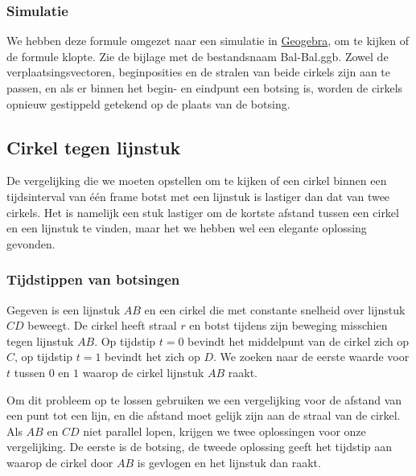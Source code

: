 \documentclass[12pt,a4paper]{article}
\begin{document}
	\subsubsection{Simulatie}
	We hebben deze formule omgezet naar een simulatie in \href{http://www.geogebra.org/webstart/geogebra.html}{Geogebra}, om te kijken of de formule klopte. Zie de bijlage met de bestandsnaam Bal-Bal.ggb. Zowel de verplaatsingsvectoren, beginposities en de stralen van beide cirkels zijn aan te passen, en als er binnen het begin- en eindpunt een botsing is, worden de cirkels opnieuw gestippeld getekend op de plaats van de botsing.
	
	\subsection{Cirkel tegen lijnstuk}
	De vergelijking die we moeten opstellen om te kijken of een cirkel binnen een tijdsinterval van \'{e}\'{e}n frame botst met een lijnstuk is lastiger dan dat van twee cirkels. Het is namelijk een stuk lastiger om de kortste afstand tussen een cirkel en een lijnstuk te vinden, maar het we hebben wel een elegante oplossing gevonden.
	
	\subsubsection{Tijdstippen van botsingen}
	Gegeven is een lijnstuk $AB$ en een cirkel die met constante snelheid over lijnstuk $CD$ beweegt. De cirkel heeft straal $r$ en botst tijdens zijn beweging misschien tegen lijnstuk $AB$. Op tijdstip $t=0$ bevindt het middelpunt van de cirkel zich op $C$, op tijdstip $t=1$ bevindt het zich op $D$. We zoeken naar de eerste waarde voor $t$ tussen $0$ en $1$ waarop de cirkel lijnstuk $AB$ raakt.
	
	Om dit probleem op te lossen gebruiken we een vergelijking voor de afstand van een punt tot een lijn, en die afstand moet gelijk zijn aan de straal van de cirkel. Als $AB$ en $CD$ niet parallel lopen, krijgen we twee oplossingen voor onze vergelijking. De eerste is de botsing, de tweede oplossing geeft het tijdstip aan waarop de cirkel door $AB$ is gevlogen en het lijnstuk dan raakt.
	
\end{document}
